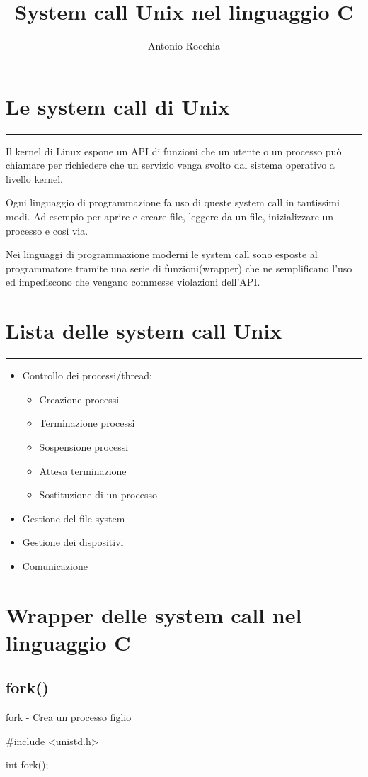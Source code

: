 \documentclass
    [10pt,        %
     a4paper,     %
     onecolumn,   %
     fleqn,       %
     oneside,     %
     notitlepage, %
     openany      %
     ]
    {article}
\title{System call Unix nel linguaggio C}
\author{Antonio Rocchia}
\newcommand\hr{
    \noindent\rule[0.5ex]{\linewidth}{0.5pt}
}
\begin{document}
\maketitle
\tableofcontents
\section{Le system call di Unix}
\hr
Il kernel di Linux espone un API di funzioni che un utente o un processo può chiamare per richiedere che un servizio venga svolto dal sistema operativo a livello kernel.

Ogni linguaggio di programmazione fa uso di queste system call in tantissimi modi. Ad esempio per aprire e creare file, leggere da un file, inizializzare un processo e così via.

Nei linguaggi di programmazione moderni le system call sono esposte al programmatore tramite una serie di funzioni(wrapper) che ne semplificano l'uso ed impediscono che vengano commesse violazioni dell'API.
\section{Lista delle system call Unix}
\hr
\begin{itemize}
    \item Controllo dei processi/thread:
        \begin{itemize}
            \item Creazione processi
            \item Terminazione processi
            \item Sospensione processi
            \item Attesa terminazione
            \item Sostituzione di un processo
        \end{itemize}
    \item Gestione del file system
    \item Gestione dei dispositivi
    \item Comunicazione
\end{itemize}

\section{Wrapper delle system call nel linguaggio C}
\subsection{fork()}
fork - Crea un processo figlio
\begin{C}
    #include <unistd.h>

    int fork();
\end{C}
\end{document}
